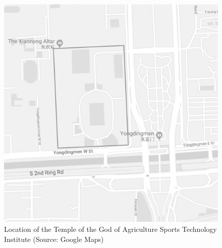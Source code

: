 \begin{CJK}{UTF8}{gbsn}
\begin{figure}[htbp]
  \centering
  \includegraphics[scale =.5]{images/beijingXNT.png}
  \caption{Location of the Temple of the God of Agriculture Sports Technology Institute  (Source: Google Maps)}
  \label{fig:beijingXNT}
\end{figure}



\end{CJK}
